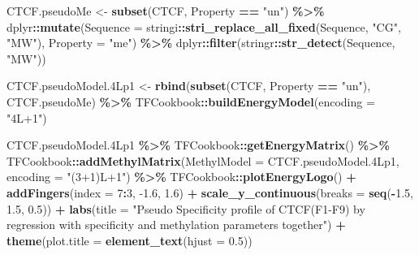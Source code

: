 \documentclass[
]{article}
\newenvironment{Shaded}{\begin{snugshade}}{\end{snugshade}}
\newcommand{\DataTypeTok}[1]{\textcolor[rgb]{0.13,0.29,0.53}{#1}}
\newcommand{\DecValTok}[1]{\textcolor[rgb]{0.00,0.00,0.81}{#1}}
\newcommand{\FloatTok}[1]{\textcolor[rgb]{0.00,0.00,0.81}{#1}}
\newcommand{\KeywordTok}[1]{\textcolor[rgb]{0.13,0.29,0.53}{\textbf{#1}}}
\newcommand{\NormalTok}[1]{#1}
\newcommand{\OperatorTok}[1]{\textcolor[rgb]{0.81,0.36,0.00}{\textbf{#1}}}
\newcommand{\StringTok}[1]{\textcolor[rgb]{0.31,0.60,0.02}{#1}}
\begin{document}
\begin{Shaded}
\begin{Highlighting}[]
\NormalTok{CTCF.pseudoMe \textless{}{-}}\StringTok{ }\KeywordTok{subset}\NormalTok{(CTCF, Property }\OperatorTok{==}\StringTok{ "un"}\NormalTok{) }\OperatorTok{\%\textgreater{}\%}
\StringTok{  }\NormalTok{dplyr}\OperatorTok{::}\KeywordTok{mutate}\NormalTok{(}\DataTypeTok{Sequence =}\NormalTok{ stringi}\OperatorTok{::}\KeywordTok{stri\_replace\_all\_fixed}\NormalTok{(Sequence, }\StringTok{"CG"}\NormalTok{, }\StringTok{"MW"}\NormalTok{),}
                \DataTypeTok{Property =} \StringTok{"me"}\NormalTok{) }\OperatorTok{\%\textgreater{}\%}
\StringTok{  }\NormalTok{dplyr}\OperatorTok{::}\KeywordTok{filter}\NormalTok{(stringr}\OperatorTok{::}\KeywordTok{str\_detect}\NormalTok{(Sequence, }\StringTok{"MW"}\NormalTok{))}

\NormalTok{CTCF.pseudoModel}\FloatTok{.4}\NormalTok{Lp1 \textless{}{-}}\StringTok{  }\KeywordTok{rbind}\NormalTok{(}\KeywordTok{subset}\NormalTok{(CTCF, Property }\OperatorTok{==}\StringTok{ "un"}\NormalTok{), CTCF.pseudoMe) }\OperatorTok{\%\textgreater{}\%}
\StringTok{  }\NormalTok{TFCookbook}\OperatorTok{::}\KeywordTok{buildEnergyModel}\NormalTok{(}\DataTypeTok{encoding =} \StringTok{"4L+1"}\NormalTok{)}

\NormalTok{CTCF.pseudoModel}\FloatTok{.4}\NormalTok{Lp1 }\OperatorTok{\%\textgreater{}\%}
\StringTok{  }\NormalTok{TFCookbook}\OperatorTok{::}\KeywordTok{getEnergyMatrix}\NormalTok{() }\OperatorTok{\%\textgreater{}\%}
\StringTok{  }\NormalTok{TFCookbook}\OperatorTok{::}\KeywordTok{addMethylMatrix}\NormalTok{(}\DataTypeTok{MethylModel =}\NormalTok{ CTCF.pseudoModel}\FloatTok{.4}\NormalTok{Lp1, }\DataTypeTok{encoding =} \StringTok{"(3+1)L+1"}\NormalTok{) }\OperatorTok{\%\textgreater{}\%}
\StringTok{  }\NormalTok{TFCookbook}\OperatorTok{::}\KeywordTok{plotEnergyLogo}\NormalTok{() }\OperatorTok{+}
\StringTok{  }\KeywordTok{addFingers}\NormalTok{(}\DataTypeTok{index =} \DecValTok{7}\OperatorTok{:}\DecValTok{3}\NormalTok{, }\FloatTok{{-}1.6}\NormalTok{, }\FloatTok{1.6}\NormalTok{) }\OperatorTok{+}
\StringTok{  }\KeywordTok{scale\_y\_continuous}\NormalTok{(}\DataTypeTok{breaks =} \KeywordTok{seq}\NormalTok{(}\OperatorTok{{-}}\FloatTok{1.5}\NormalTok{, }\FloatTok{1.5}\NormalTok{, }\FloatTok{0.5}\NormalTok{)) }\OperatorTok{+}
\StringTok{  }\KeywordTok{labs}\NormalTok{(}\DataTypeTok{title =} \StringTok{"Pseudo Specificity profile of CTCF(F1{-}F9) }
\StringTok{       by regression with specificity and methylation parameters together"}\NormalTok{) }\OperatorTok{+}
\StringTok{  }\KeywordTok{theme}\NormalTok{(}\DataTypeTok{plot.title =} \KeywordTok{element\_text}\NormalTok{(}\DataTypeTok{hjust =} \FloatTok{0.5}\NormalTok{))}
\end{Highlighting}
\end{Shaded}
\end{document}

